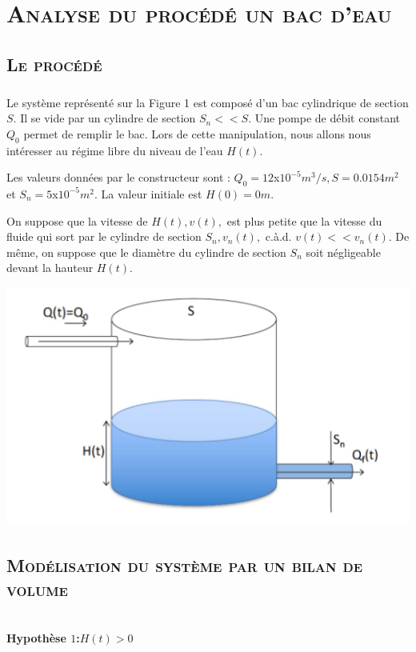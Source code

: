 \chapter{\textsc{Analyse du procédé un bac d'eau}}
\section{\textsc{Le procédé}}
 
 	\paragraph{} Le système représenté sur la Figure 1 est composé d’un bac cylindrique de section $S$. Il se vide par un cylindre de section $S_n << S$. Une pompe de débit constant $Q_0$ permet de remplir le bac. Lors de cette manipulation, nous allons nous intéresser au régime libre du niveau de l’eau $H(t)$.
\par Les valeurs données par le constructeur sont : $Q_0 = 12$x$10^{-5}m^3/s, S = 0.0154m^2$ et $S_n = 5$x$ 10^{-5} m^2$. La valeur initiale est $H(0) = 0m$.
\par On suppose que la vitesse de $H(t), v(t),$ est plus petite que la vitesse du fluide qui sort par le cylindre de
section $S_n , v_n (t),$ c.à.d. $v(t) << v_n (t)$. De même, on suppose que le diamètre du cylindre de section $S_n$ soit négligeable devant la hauteur $H(t)$.
	
	\begin{center}
	\includegraphics[scale=0.5]{1bac.png}
	\label{fig1} 
	\end{center}   

\break

\section{\textsc{Modélisation du système par un bilan de volume }}\\
\textbf{Hypothèse $1$:}\indent $H(t)>0$\\

